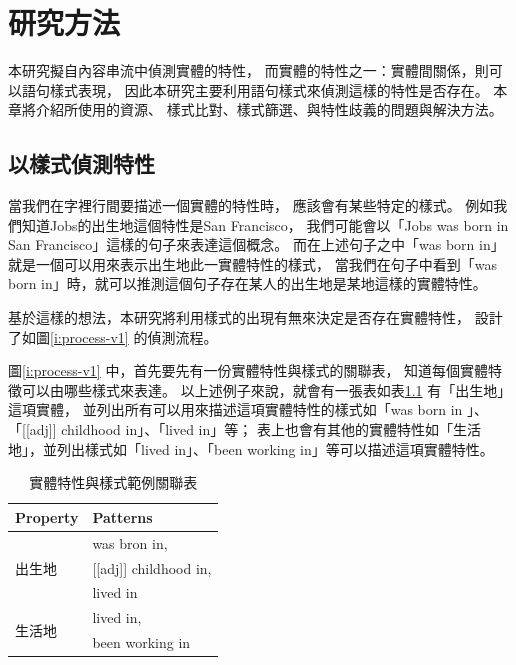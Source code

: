 %
%
%
\chapter{研究方法}
\label{c:method}

本研究擬自內容串流中偵測實體的特性，
而實體的特性之一：實體間關係，則可以語句樣式表現，
因此本研究主要利用語句樣式來偵測這樣的特性是否存在。
本章將介紹所使用的資源、
樣式比對、樣式篩選、與特性歧義的問題與解決方法。

\section{以樣式偵測特性}
當我們在字裡行間要描述一個實體的特性時，
應該會有某些特定的樣式。
例如我們知道Jobs的出生地這個特性是San Francisco，
我們可能會以「Jobs was born in San Francisco」這樣的句子來表達這個概念。
而在上述句子之中「was born in」就是一個可以用來表示出生地此一實體特性的樣式，
當我們在句子中看到「was born in」時，就可以推測這個句子存在某人的出生地是某地這樣的實體特性。

基於這樣的想法，本研究將利用樣式的出現有無來決定是否存在實體特性，
設計了如圖\ref{i:process-v1} 的偵測流程。

圖\ref{i:process-v1} 中，首先要先有一份實體特性與樣式的關聯表，
知道每個實體特徵可以由哪些樣式來表達。
以上述例子來說，就會有一張表如表\ref{t:ext} 有「出生地」這項實體，
並列出所有可以用來描述這項實體特性的樣式如「was born in 」、「[[adj]] childhood in」、「lived in」等；
表上也會有其他的實體特性如「生活地」，並列出樣式如「lived in」、「been working in」等可以描述這項實體特性。

\begin{table}
    \centering
    \footnotesize
    \begin{tabular}{|l|l|}
        \hline
        Property & Patterns \\
        \hline
        \multirow{3}{*}{出生地} & was bron in, \\
         & [[adj]] childhood in, \\
         & lived in\\
        \hline
        \multirow{2}{*}{生活地} & lived in, \\
         & been working in\\
        \hline
    \end{tabular}
    \caption{實體特性與樣式範例關聯表}
    \label{t:ext}
\end{table}

